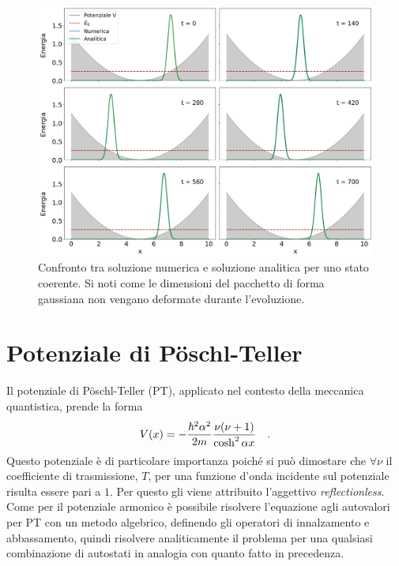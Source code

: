 \begin{figure}
    \centering
    \includegraphics[width = \textwidth]{immagini/coherent_ev.png}
    \caption{Confronto tra soluzione numerica e soluzione analitica per uno stato coerente. Si noti come le dimensioni del pacchetto di forma gaussiana non vengano deformate durante l'evoluzione.}
    \label{fig:coherent_ev}
\end{figure}



\section{Potenziale di P\"oschl-Teller}
\label{sec:RL}

Il potenziale di P\"oschl-Teller (PT), applicato nel contesto della meccanica quantistica, prende la forma 
\begin{equation}
    \centering
    V(x) = -\frac{\hbar^2 \alpha^2}{2m} \frac{\nu (\nu + 1)}{\cosh^2 \alpha x} \quad \text{.}
    \label{eq:pot_PT}
\end{equation}
Questo potenziale è di particolare importanza poiché si può dimostare che $\forall \nu$ il coefficiente di trasmissione, $T$, per una funzione d'onda incidente sul potenziale risulta essere pari a $1$. Per questo gli viene attribuito l'aggettivo \textsl{reflectionless}.   
Come per il potenziale armonico è possibile risolvere l'equazione agli autovalori per PT con un metodo algebrico, definendo gli operatori di innalzamento e abbassamento, quindi risolvere analiticamente il problema per una qualsiasi combinazione di autostati in analogia con quanto fatto in precedenza. \cite{Jaffe:RL_sol}

